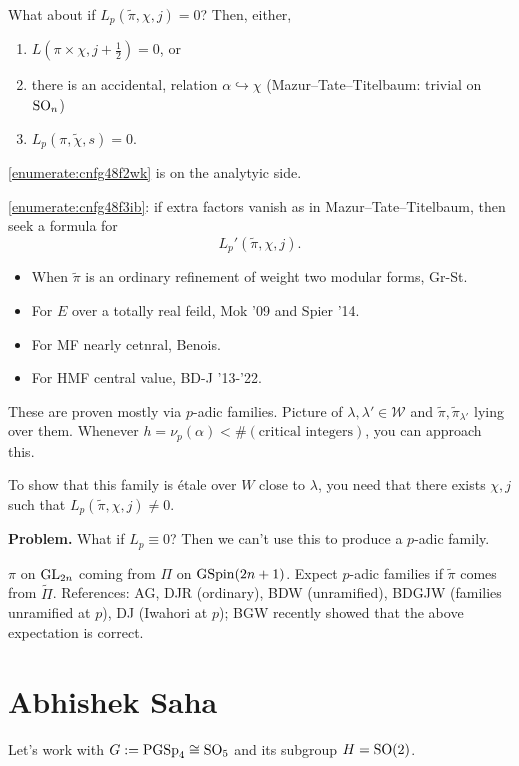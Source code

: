 \documentclass[reqno]{amsart} 
\begin{document}
What about if $L_p(\tilde{\pi}, \chi, j) = 0$?  Then, either,
\begin{enumerate}
\item\label{enumerate:cnfg48f2wk} $L(\pi \times \chi, j + \tfrac{1}{2}) = 0$, or
\item\label{enumerate:cnfg48f3ib} there is an accidental, relation $\alpha \hookrightarrow \chi$ (Mazur--Tate--Titelbaum: trivial on $\operatorname{SO}_n$)
\item\label{enumerate:cnfg48f4du} $L_p(\tilde{\pi, \chi, s})= 0$.
\end{enumerate}

\eqref{enumerate:cnfg48f2wk} is on the analytyic side.

\eqref{enumerate:cnfg48f3ib}: if extra factors vanish as in Mazur--Tate--Titelbaum, then seek a formula for
\begin{equation*}
  L_p '(\tilde{\pi}, \chi, j).
\end{equation*}
\begin{itemize}
\item When $\tilde{\pi}$ is an ordinary refinement of weight two modular forms, Gr-St.
\item For $E$ over a totally real feild, Mok '09 and Spier '14.
\item For MF nearly cetnral, Benois.
\item For HMF central value, BD-J '13-'22.
\end{itemize}
These are proven mostly via $p$-adic families.  Picture of $\lambda , \lambda ' \in \mathcal{W}$ and $\tilde{\pi}, \tilde{\pi}_{\lambda '}$ lying over them.  Whenever $h = \nu_p(\alpha) < \#(\text{critical integers})$, you can approach this.

To show that this family is {\'e}tale over $W$ close to $\lambda$, you need that there exists $\chi, j$ such that $L_p(\tilde{\pi}, \chi, j) \neq 0$.

\textbf{Problem.}  What if $L_p \equiv 0$?  Then we can't use this to produce a $p$-adic family.

$\pi$ on $\operatorname{GL}_{2n}$ coming from $\Pi$ on $\operatorname{GSpin}(2 n + 1)$.  Expect $p$-adic families if $\tilde{\pi}$ comes from $\tilde{\Pi}$.  References: AG, DJR (ordinary), BDW (unramified), BDGJW (families unramified at $p$), DJ (Iwahori at $p$); BGW recently showed that the above expectation is correct.

\section{Abhishek Saha}\label{sec:cnfhlputsj}
Let's work with $G := \operatorname{PGSp}_4 \cong \operatorname{SO}_5$ and its subgroup $H = \operatorname{SO}(2)$.
\end{document}
